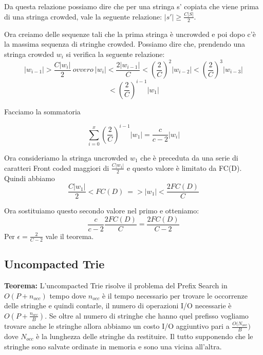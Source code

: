 \documentclass[12pt]{article}
\begin{document}
Da questa relazione possiamo dire che per una stringa s' copiata che viene prima di una stringa crowded, vale la seguente relazione: $|s'| \geq \frac{C|S|}{2}$.

Ora creiamo delle sequenze tali che la prima stringa è uncrowded e poi dopo c'è la massima sequenza di stringhe crowded. 
Possiamo dire che, prendendo una stringa crowded $w_i$ si verifica la seguente relazione:
\begin{equation}
|w_{i-1}| > \frac{C|w_i|}{2} \ ovvero \ |w_{i}| < \frac{2|w_{i-1}|}{C} < (\frac{2}{C})^2|w_{i-2}| < (\frac{2}{C})^3|w_{i-3}|
\end{equation}
\begin{equation}
< (\frac{2}{C})^{i-1}|w_{1}|
\end{equation} 

Facciamo la sommatoria

\begin{equation}
\sum_{i=0}^x  (\frac{2}{C})^{i-1}|w_{1}| = \frac{c}{c-2}|w_i|
\end{equation}

Ora consideriamo la stringa uncrowded $w_1$ che è preceduta da una serie di caratteri Front coded maggiori di $\frac{C|w_1|}{2}$ e questo valore è limitato da FC(D).
Quindi abbiamo
\begin{equation}
\frac{C|w_1|}{2} < FC(D) \ => |w_1| < \frac{2FC(D)}{C}
\end{equation}

Ora sostituiamo questo secondo valore nel primo e otteniamo:
\begin{equation}
\frac{c}{c-2}\frac{2FC(D)}{C} = \frac{2FC(D)}{C-2}
\end{equation}
Per $\epsilon = \frac{2}{C-2}$ vale il teorema.

\subsection{Uncompacted Trie}


\textbf{Teorema:} L'uncompacted Trie risolve il problema del Prefix Search in $O(P+n_{occ})$ tempo dove $n_{occ}$ è il tempo necessario per trovare le occorrenze delle stringhe e quindi contarle, il numero di operazioni I/O necessarie è $O(P+\frac{n_{occ}}{B})$. Se oltre al numero di stringhe che hanno quel prefisso vogliamo trovare anche le stringhe allora abbiamo un costo I/O aggiuntivo pari a $\frac{O(N_{occ}}{B})$ dove $N_{occ}$ è la lunghezza delle stringhe da restituire.
Il tutto supponendo che le stringhe sono salvate ordinate in memoria e sono una vicina all'altra.
\end{document}
